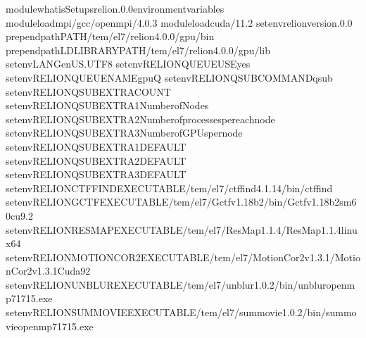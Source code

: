 \documentclass[a4paper,11pt,english]{sphinxmanual}
\begin{document}
\begin{sphinxVerbatim}[commandchars=\\\{\}]
module\PYGZhy{}whatisSetupsrelion.0.0environmentvariables
moduleloadmpi/gcc/openmpi/4.0.3
moduleloadcuda/11.2
setenvrelion\PYGZus{}version.0.0
prepend\PYGZhy{}pathPATH/tem/el7/relion\PYGZhy{}4.0.0/gpu/bin
prepend\PYGZhy{}pathLD\PYGZus{}LIBRARY\PYGZus{}PATH/tem/el7/relion\PYGZhy{}4.0.0/gpu/lib
setenvLANGen\PYGZus{}US.UTF\PYGZhy{}8
setenvRELION\PYGZus{}QUEUE\PYGZus{}USEyes
setenvRELION\PYGZus{}QUEUE\PYGZus{}NAMEgpuQ
setenvRELION\PYGZus{}QSUB\PYGZus{}COMMANDqsub
setenvRELION\PYGZus{}QSUB\PYGZus{}EXTRA\PYGZus{}COUNT
setenvRELION\PYGZus{}QSUB\PYGZus{}EXTRA1NumberofNodes
setenvRELION\PYGZus{}QSUB\PYGZus{}EXTRA2Numberofprocessespereachnode
setenvRELION\PYGZus{}QSUB\PYGZus{}EXTRA3NumberofGPUspernode
setenvRELION\PYGZus{}QSUB\PYGZus{}EXTRA1\PYGZus{}DEFAULT
setenvRELION\PYGZus{}QSUB\PYGZus{}EXTRA2\PYGZus{}DEFAULT
setenvRELION\PYGZus{}QSUB\PYGZus{}EXTRA3\PYGZus{}DEFAULT
setenvRELION\PYGZus{}CTFFIND\PYGZus{}EXECUTABLE/tem/el7/ctffind\PYGZhy{}4.1.14/bin/ctffind
setenvRELION\PYGZus{}GCTF\PYGZus{}EXECUTABLE/tem/el7/Gctf\PYGZus{}v1.18\PYGZus{}b2/bin/Gctf\PYGZus{}v1.18\PYGZus{}b2\PYGZus{}sm60\PYGZus{}cu9.2
setenvRELION\PYGZus{}RESMAP\PYGZus{}EXECUTABLE/tem/el7/ResMap\PYGZhy{}1.1.4/ResMap\PYGZhy{}1.1.4\PYGZhy{}linux64
setenvRELION\PYGZus{}MOTIONCOR2\PYGZus{}EXECUTABLE/tem/el7/MotionCor2\PYGZus{}v1.3.1/MotionCor2\PYGZus{}v1.3.1\PYGZhy{}Cuda92
setenvRELION\PYGZus{}UNBLUR\PYGZus{}EXECUTABLE/tem/el7/unblur\PYGZus{}1.0.2/bin/unblur\PYGZus{}openmp\PYGZus{}7\PYGZus{}17\PYGZus{}15.exe
setenvRELION\PYGZus{}SUMMOVIE\PYGZus{}EXECUTABLE/tem/el7/summovie\PYGZus{}1.0.2/bin/sum\PYGZus{}movie\PYGZus{}openmp\PYGZus{}7\PYGZus{}17\PYGZus{}15.exe

\end{sphinxVerbatim}
\end{document}
